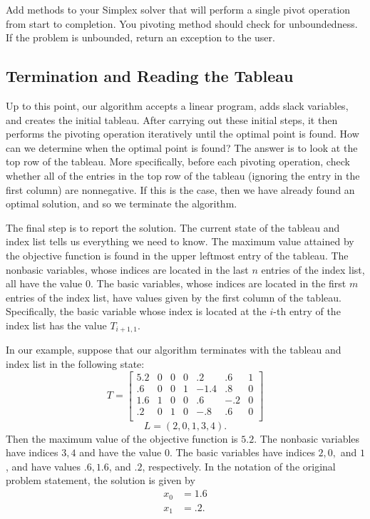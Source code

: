 \begin{problem}
Add methods to your Simplex solver that will perform a single pivot operation from start to completion.
You pivoting method should check for unboundedness.
If the problem is unbounded, return an exception to the user.
\end{problem}

\subsection{Termination and Reading the Tableau}
Up to this point, our algorithm accepts a linear program, adds slack variables, and creates the initial tableau. After
carrying out these initial steps, it then performs the pivoting operation iteratively until the optimal point is found.
How can we determine when the optimal point is found? The answer is to look at the top row of the tableau. More specifically,
before each pivoting operation, check whether all of the entries in the top row of the tableau (ignoring the entry in the first
column) are nonnegative. If this is the case, then we have already found an optimal solution, and so we terminate the algorithm.

The final step is to report the solution. The current state of the tableau and index list tells us everything we need to know.
The maximum value attained by the objective function is found in the upper leftmost entry of the tableau. The nonbasic variables,
whose indices are located in the last $n$ entries of the index list, all have the value $0$. The basic variables, whose indices
are located in the first $m$ entries of the index list, have values given by the first column of the tableau. Specifically, the basic
variable whose index is located at the $i$-th entry of the index list has the value $T_{i+1, 1}$.

In our example, suppose that our algorithm terminates with the tableau and index list in the following state:
\[
T = \begin{bmatrix}
5.2 & 0 & 0 & 0 & .2 & .6 & 1\\
.6 & 0 & 0 & 1 & -1.4 & .8 & 0\\
1.6 & 1 & 0 & 0 & .6 & -.2 & 0\\
.2 & 0 & 1 & 0 & -.8 & .6 & 0\\
\end{bmatrix}
\]
\[
L = (2, 0, 1, 3, 4).
\]
Then the maximum value of the objective function is $5.2$. The nonbasic variables have indices $3, 4$ and have the value $0$.
The basic variables have indices $2, 0,$ and $1$, and have values $.6, 1.6$, and $.2$, respectively.
In the notation of the original problem statement, the solution is given by
\begin{align*}
x_0 &= 1.6\\
x_1 &= .2.
\end{align*}

